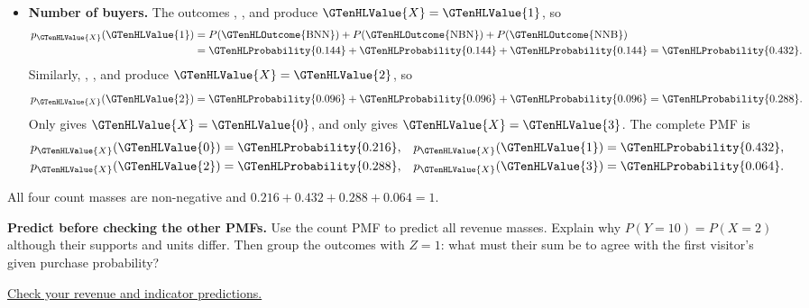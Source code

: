 \begin{itemize}
	\item \textbf{Number of buyers.}
	The outcomes , , and  produce $\GTenHLValue{X}=\GTenHLValue{1}$, so
	\[
	\begin{aligned}
		p_{\GTenHLValue{X}}(\GTenHLValue{1})
		&=P(\GTenHLOutcome{\mathrm{BNN}})+P(\GTenHLOutcome{\mathrm{NBN}})+P(\GTenHLOutcome{\mathrm{NNB}})\\
		&=\GTenHLProbability{0.144}+\GTenHLProbability{0.144}+\GTenHLProbability{0.144}=\GTenHLProbability{0.432}.
	\end{aligned}
	\]
	Similarly, , , and  produce $\GTenHLValue{X}=\GTenHLValue{2}$, so
	\[
	p_{\GTenHLValue{X}}(\GTenHLValue{2})=\GTenHLProbability{0.096}+\GTenHLProbability{0.096}+\GTenHLProbability{0.096}=\GTenHLProbability{0.288}.
	\]
	Only  gives $\GTenHLValue{X}=\GTenHLValue{0}$, and only  gives $\GTenHLValue{X}=\GTenHLValue{3}$.
	The complete PMF is
	\[
	\begin{aligned}
		p_{\GTenHLValue{X}}(\GTenHLValue{0})&=\GTenHLProbability{0.216}, & p_{\GTenHLValue{X}}(\GTenHLValue{1})&=\GTenHLProbability{0.432},\\
		p_{\GTenHLValue{X}}(\GTenHLValue{2})&=\GTenHLProbability{0.288}, & p_{\GTenHLValue{X}}(\GTenHLValue{3})&=\GTenHLProbability{0.064}.
	\end{aligned}
	\]

	\end{itemize}
All four count masses are non-negative and $0.216+0.432+0.288+0.064=1$.

\textbf{Predict before checking the other PMFs.} Use the count PMF to predict all revenue masses. Explain why $P(Y=10)=P(X=2)$ although their supports and units differ. Then group the outcomes with $Z=1$: what must their sum be to agree with the first visitor's given purchase probability?

\par\smallskip\noindent\hyperref[check:sale-comparisons]{Check your revenue and indicator predictions.}
